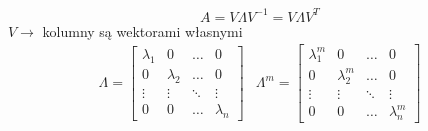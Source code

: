 $$A=V\Lambda V^{-1}=V\Lambda V^T$$
$V\rightarrow $ kolumny są wektorami własnymi
\begin{align*}
\Lambda = \begin{bmatrix}
\lambda _1 & 0 & \dots & 0\\
0 & \lambda _2 & \dots & 0 \\
\vdots & \vdots & \ddots & \vdots \\
0 & 0 & \dots & \lambda _n
\end{bmatrix} & \Lambda ^m =\begin{bmatrix}
\lambda _1^m & 0 & \dots & 0\\
0 & \lambda _2^m & \dots & 0 \\
\vdots & \vdots & \ddots & \vdots \\
0 & 0 & \dots & \lambda _n^m
\end{bmatrix}
\end{align*}

